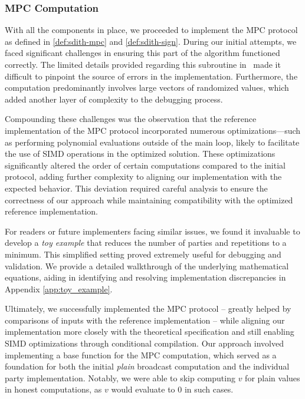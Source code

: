 \documentclass[11pt]{report}
\theoremstyle{definition}
\theoremstyle{plain}
\begin{document}
\subsubsection{MPC Computation}

With all the components in place, we proceeded to implement the MPC protocol as defined in \autoref{def:sdith-mpc} and \autoref{def:sdith-sign}. During our initial attempts, we faced significant challenges in ensuring this part of the algorithm functioned correctly. The limited details provided regarding this subroutine in~\cite{aguilarsyndrome11} made it difficult to pinpoint the source of errors in the implementation. Furthermore, the computation predominantly involves large vectors of randomized values, which added another layer of complexity to the debugging process.

Compounding these challenges was the observation that the reference implementation of the MPC protocol incorporated numerous optimizations—such as performing polynomial evaluations outside of the main loop, likely to facilitate the use of SIMD operations in the optimized solution. These optimizations significantly altered the order of certain computations compared to the initial protocol, adding further complexity to aligning our implementation with the expected behavior. This deviation required careful analysis to ensure the correctness of our approach while maintaining compatibility with the optimized reference implementation.

For readers or future implementers facing similar issues, we found it invaluable to develop a \textit{toy example} that reduces the number of parties and repetitions to a minimum. This simplified setting proved extremely useful for debugging and validation. We provide a detailed walkthrough of the underlying mathematical equations, aiding in identifying and resolving implementation discrepancies in Appendix \ref{app:toy_example}.

Ultimately, we successfully implemented the MPC protocol -- greatly helped by comparisons of inputs with the reference implementation -- while aligning our implementation more closely with the theoretical specification and still enabling SIMD optimizations through conditional compilation. Our approach involved implementing a base function for the MPC computation, which served as a foundation for both the initial \textit{plain} broadcast computation and the individual party implementation. Notably, we were able to skip computing $v$ for plain values in honest computations, as $v$ would evaluate to $0$ in such cases.
\end{document}
